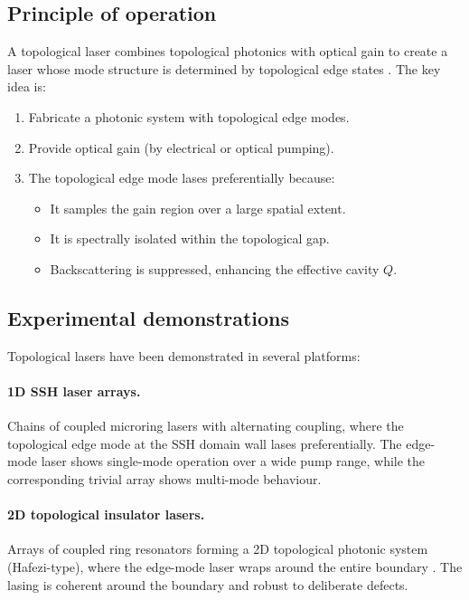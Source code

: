 \subsection{Principle of operation}
\label{sec:ch17-laser-principle}

A topological laser combines topological photonics with optical gain to
create a laser whose mode structure is determined by topological edge
states
\cite{harari2018topological,bandres2018topologicalb}.  The key idea is:
\begin{enumerate}
  \item Fabricate a photonic system with topological edge modes.
  \item Provide optical gain (by electrical or optical pumping).
  \item The topological edge mode lases preferentially because:
  \begin{itemize}
    \item It samples the gain region over a large spatial extent.
    \item It is spectrally isolated within the topological gap.
    \item Backscattering is suppressed, enhancing the effective
    cavity $Q$.
  \end{itemize}
\end{enumerate}

\subsection{Experimental demonstrations}
\label{sec:ch17-laser-demos}

Topological lasers have been demonstrated in several platforms:

\paragraph{1D SSH laser arrays.}
Chains of coupled microring lasers with alternating coupling, where
the topological edge mode at the SSH domain wall lases preferentially.
The edge-mode laser shows single-mode operation over a wide pump range,
while the corresponding trivial array shows multi-mode behaviour.

\paragraph{2D topological insulator lasers.}
Arrays of coupled ring resonators forming a 2D topological photonic
system (Hafezi-type), where the edge-mode laser wraps around the
entire boundary \cite{zhu2026topology}.  The lasing is coherent around the boundary and
robust to deliberate defects.

